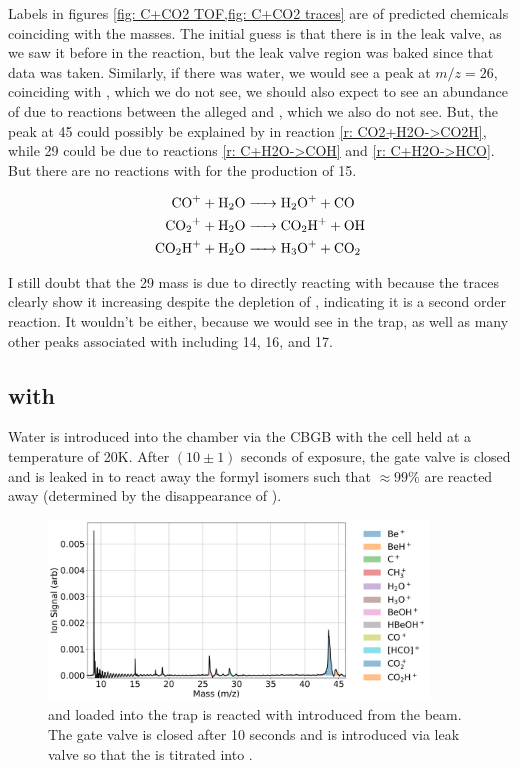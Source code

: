 Labels in figures \cref{fig: C+CO2 TOF,fig: C+CO2 traces} are of predicted chemicals coinciding with the masses. The initial guess is that there is  in the leak valve, as we saw it before in the  reaction, but the leak valve region was baked since that data was taken. Similarly, if there was water, we would see a peak at $m/z=26$, coinciding with , which we do not see, we should also expect to see an abundance of  due to reactions between the alleged \ce{[HCO]+} and , which we also do not see. But, the peak at 45 could possibly be explained by  in reaction \ref{r: CO2+H2O->CO2H}, while 29 could be due to reactions \ref{r: C+H2O->COH} and \ref{r: C+H2O->HCO}. But there are no reactions with  for the production of 15.

\begin{align}
	\ce{CO+ + H2O & -> H2O+ + CO} \\
	\ce{CO2+ + H2O & -> CO2H+ + OH} \label{r: CO2+H2O->CO2H} \\
	\ce{CO2H+ + H2O & -> H3O+ + CO2}
\end{align}

I still doubt that the 29 mass is due to  directly reacting with  because the traces clearly show it increasing despite the depletion of , indicating it is a second order reaction. It wouldn't be  either, because we would see  in the trap, as well as many other peaks associated with  including 14, 16, and 17.

\subsection{ with }
Water is introduced into the chamber via the CBGB with the cell held at a temperature of 20K. After $(10 \pm 1)$ seconds of exposure, the gate valve is closed and  is leaked in to react away the formyl isomers such that $\approx 99\%$ are reacted away (determined by the disappearance of ).

\begin{figure}[H]
	\centering
	\includegraphics[width=0.9\textwidth]{images/C_H2O_CO2_titration_TOF.png}
	\caption{ and  loaded into the trap is reacted with  introduced from the beam. The gate valve is closed after 10 seconds and  is introduced via leak valve so that the  is titrated into .}
\end{figure}

